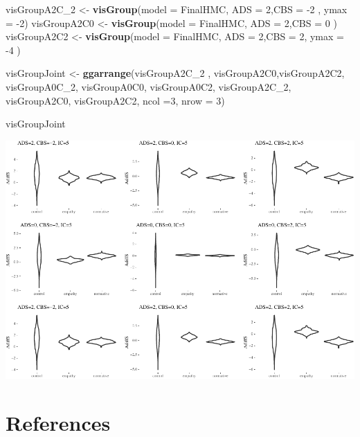 \documentclass[10pt,dvipsnames,enabledeprecatedfontcommands]{scrartcl}
\newenvironment{Shaded}{\begin{snugshade}}{\end{snugshade}}
\newcommand{\KeywordTok}[1]{\textcolor[rgb]{0.13,0.29,0.53}{\textbf{#1}}}
\newcommand{\DataTypeTok}[1]{\textcolor[rgb]{0.13,0.29,0.53}{#1}}
\newcommand{\DecValTok}[1]{\textcolor[rgb]{0.00,0.00,0.81}{#1}}
\newcommand{\StringTok}[1]{\textcolor[rgb]{0.31,0.60,0.02}{#1}}
\newcommand{\NormalTok}[1]{#1}
\begin{document}
\begin{Shaded}
\begin{Highlighting}[]
\NormalTok{visGroupA2C_}\DecValTok{2}\NormalTok{ <-}\StringTok{  }\KeywordTok{visGroup}\NormalTok{(}\DataTypeTok{model =}\NormalTok{ FinalHMC, }\DataTypeTok{ADS =} \DecValTok{2}\NormalTok{,}\DataTypeTok{CBS =} \DecValTok{-2}\NormalTok{ , }\DataTypeTok{ymax =} \DecValTok{-2}\NormalTok{)}
\NormalTok{visGroupA2C0 <-}\StringTok{ }\KeywordTok{visGroup}\NormalTok{(}\DataTypeTok{model =}\NormalTok{ FinalHMC, }\DataTypeTok{ADS =} \DecValTok{2}\NormalTok{,}\DataTypeTok{CBS =} \DecValTok{0}\NormalTok{ )}
\NormalTok{visGroupA2C2 <-}\StringTok{ }\KeywordTok{visGroup}\NormalTok{(}\DataTypeTok{model =}\NormalTok{ FinalHMC, }\DataTypeTok{ADS =} \DecValTok{2}\NormalTok{,}\DataTypeTok{CBS =} \DecValTok{2}\NormalTok{, }\DataTypeTok{ymax =} \DecValTok{-4}\NormalTok{ )}

\NormalTok{visGroupJoint <-}\StringTok{ }\KeywordTok{ggarrange}\NormalTok{(visGroupA2C_}\DecValTok{2}\NormalTok{ , visGroupA2C0,visGroupA2C2, }
\NormalTok{          visGroupA0C_}\DecValTok{2}\NormalTok{, visGroupA0C0, visGroupA0C2,}
\NormalTok{          visGroupA2C_}\DecValTok{2}\NormalTok{, visGroupA2C0, visGroupA2C2, }\DataTypeTok{ncol =}\DecValTok{3}\NormalTok{, }\DataTypeTok{nrow =} \DecValTok{3}\NormalTok{)}

\NormalTok{visGroupJoint}
\end{Highlighting}
\end{Shaded}

\begin{center}\includegraphics[width=1\linewidth]{bayesianReport_files/figure-latex/unnamed-chunk-14-1} \end{center}

\normalsize

\section*{References}\label{references}

\vspace{-3mm}
\end{document}
